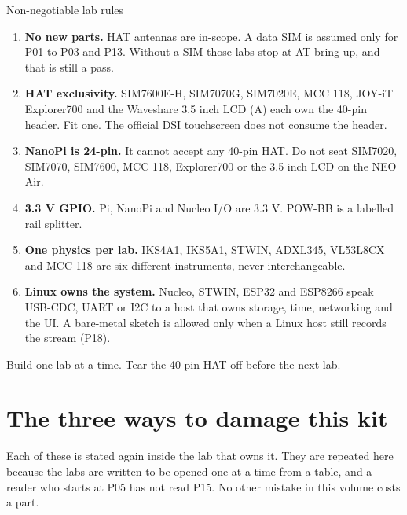 \begin{rulebox}{Non-negotiable lab rules}
\begin{enumerate}
\item \textbf{No new parts.} HAT antennas are in-scope. A data SIM is assumed only for P01 to P03 and P13. Without a SIM those labs stop at AT bring-up, and that is still a pass.
\item \textbf{HAT exclusivity.} SIM7600E-H, SIM7070G, SIM7020E, MCC 118, JOY-iT Explorer700 and the Waveshare 3.5 inch LCD (A) each own the 40-pin header. Fit one. The official DSI touchscreen does not consume the header.
\item \textbf{NanoPi is 24-pin.} It cannot accept any 40-pin HAT. Do not seat SIM7020, SIM7070, SIM7600, MCC 118, Explorer700 or the 3.5 inch LCD on the NEO Air.
\item \textbf{3.3 V GPIO.} Pi, NanoPi and Nucleo I/O are 3.3 V. POW-BB is a labelled rail splitter.
\item \textbf{One physics per lab.} IKS4A1, IKS5A1, STWIN, ADXL345, VL53L8CX and MCC 118 are six different instruments, never interchangeable.
\item \textbf{Linux owns the system.} Nucleo, STWIN, ESP32 and ESP8266 speak USB-CDC, UART or I2C to a host that owns storage, time, networking and the UI. A bare-metal sketch is allowed only when a Linux host still records the stream (P18).
\end{enumerate}
\end{rulebox}

Build one lab at a time. Tear the 40-pin HAT off before the next lab.

\section*{The three ways to damage this kit}

Each of these is stated again inside the lab that owns it. They are repeated here because the labs are written to be opened one at a time from a table, and a reader who starts at P05 has not read P15. No other mistake in this volume costs a part.

